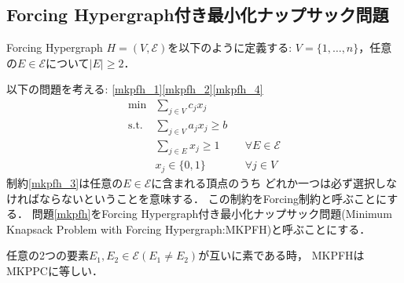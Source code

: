 \documentclass[11pt,dvipdfmx]{jarticle}
\numberwithin{equation}{section}
\begin{document}
    \subsection{Forcing Hypergraph付き最小化ナップサック問題}
        Forcing Hypergraph $H=(V,\mathcal{E})$を以下のように定義する: $V=\{1, \dotsc, n \}$，任意の$E\in\mathcal{E}$について$|E|\ge2$．\par
        以下の問題を考える:\color{white} \eqref{mkpfh_1}\eqref{mkpfh_2}\eqref{mkpfh_4}\color{black}
        \begin{subequations}
            \begin{align}
                    \mathrm{min}  & \displaystyle\sum_{j\in V}{c_j x_j}  \label{mkpfh_1}\\
                    \mathrm{s.t.} & \displaystyle\sum_{j\in V}{a_jx_j} \ge b \label{mkpfh_2}\\
                                & \displaystyle\sum_{j\in E}{x_j} \ge 1 && \forall E\in \mathcal{E}\label{mkpfh_3}\\
                                & x_j \in \{0,1\} && \forall j\in V \label{mkpfh_4}
            \end{align}\label{mkpfh}
        \end{subequations}
        制約\eqref{mkpfh_3}は任意の$E\in\mathcal{E}$に含まれる頂点のうち
        どれか一つは必ず選択しなければならないということを意味する．
        この制約をForcing制約と呼ぶことにする．
        問題\eqref{mkpfh}をForcing Hypergraph付き最小化ナップサック問題(Minimum Knapsack Problem with Forcing Hypergraph:MKPFH)と呼ぶことにする．\par
        任意の2つの要素$E_1,E_2\in\mathcal{E}(E_1\neq E_2)$が互いに素である時，
        MKPFHはMKPPCに等しい．
    
\end{document}
